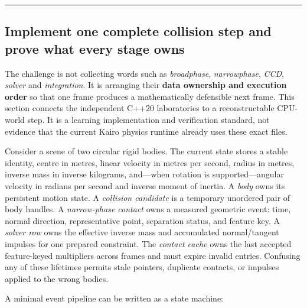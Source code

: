 \begin{center}\rule{0.5\linewidth}{0.5pt}\end{center}

\subsection{Implement one complete collision step and prove what every stage owns}\label{06-engine-ii-ch046-implement-one-complete-collision-step-and-prove-what-every-stage-owns}

\hypertarget{06-engine-ii-ch046-implement-one-complete-collision-step-and-prove-what-every-stage-owns}{}

The challenge is not collecting words such as \emph{broadphase}, \emph{narrowphase}, \emph{CCD}, \emph{solver} and \emph{integration}. It is arranging their \textbf{data ownership and execution order} so that one frame produces a mathematically defensible next frame. This section connects the independent C++20 laboratories to a reconstructable CPU-world step. It is a learning implementation and verification standard, not evidence that the current Kairo physics runtime already uses these exact files.

Consider a scene of two circular rigid bodies. The current state stores a stable identity, centre in metres, linear velocity in metres per second, radius in metres, inverse mass in inverse kilograms, and---when rotation is supported---angular velocity in radians per second and inverse moment of inertia. A \emph{body} owns its persistent motion state. A \emph{collision candidate} is a temporary unordered pair of body handles. A \emph{narrow-phase contact} owns a measured geometric event: time, normal direction, representative point, separation status, and feature key. A \emph{solver row} owns the effective inverse mass and accumulated normal/tangent impulses for one prepared constraint. The \emph{contact cache} owns the last accepted feature-keyed multipliers across frames and must expire invalid entries. Confusing any of these lifetimes permits stale pointers, duplicate contacts, or impulses applied to the wrong bodies.

A minimal event pipeline can be written as a state machine:

